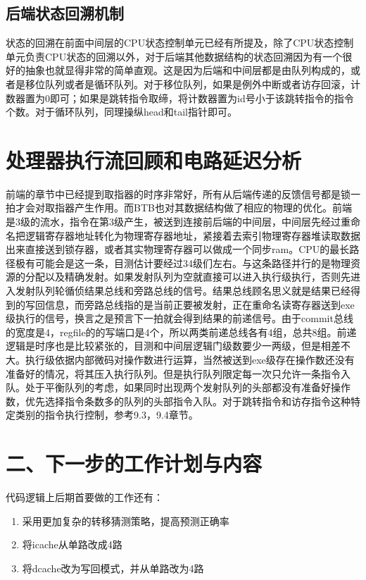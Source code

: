 \documentclass[11pt]{article}
\begin{document}
\subsection{后端状态回溯机制}
状态的回溯在前面中间层的CPU状态控制单元已经有所提及，除了CPU状态控制单元负责CPU状态的回溯以外，对于后端其他数据结构的状态回溯因为有一个很好的抽象也就显得非常的简单直观。这是因为后端和中间层都是由队列构成的，或者是移位队列或者是循环队列。对于移位队列，如果是例外中断或者访存回滚，计数器置为0即可；如果是跳转指令取缔，将计数器置为id号小于该跳转指令的指令个数。对于循环队列，同理操纵head和tail指针即可。
\section{处理器执行流回顾和电路延迟分析}
前端的章节中已经提到取指器的时序非常好，所有从后端传递的反馈信号都是锁一拍才会对取指器产生作用。而BTB也对其数据结构做了相应的物理的优化。前端是3级的流水，指令在第3级产生，被送到连接前后端的中间层，中间层先经过重命名把逻辑寄存器地址转化为物理寄存器地址，紧接着去索引物理寄存器堆读取数据出来直接送到锁存器，或者其实物理寄存器可以做成一个同步ram。CPU的最长路径极有可能会是这一条，目测估计要经过34级们左右。与这条路径并行的是物理资源的分配以及精确发射。如果发射队列为空就直接可以进入执行级执行，否则先进入发射队列轮循侦结果总线和旁路总线的信号。结果总线顾名思义就是结果已经得到的写回信息，而旁路总线指的是当前正要被发射，正在重命名读寄存器送到exe级执行的信号，换言之是预言下一拍就会得到结果的前递信号。由于commit总线的宽度是4，regfile的的写端口是4个，所以两类前递总线各有4组，总共8组。前递逻辑是时序也是比较紧张的，目测和中间层逻辑门级数要少一两级，但是相差不大。执行级依据内部微码对操作数进行运算，当然被送到exe级存在操作数还没有准备好的情况，将其压入执行队列。但是执行队列限定每一次只允许一条指令入队。处于平衡队列的考虑，如果同时出现两个发射队列的头部都没有准备好操作数，优先选择指令条数多的队列的头部指令入队。对于跳转指令和访存指令这种特定类别的指令执行控制，参考9.3，9.4章节。

\section*{\huge{二、下一步的工作计划与内容}}
代码逻辑上后期首要做的工作还有：
\begin{enumerate}
	\item 采用更加复杂的转移猜测策略，提高预测正确率
	\item 将icache从单路改成4路
	\item 将dcache改为写回模式，并从单路改为4路
\end{enumerate}
\end{document}
